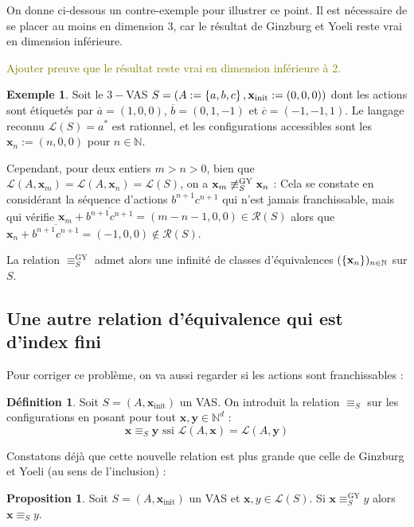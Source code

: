 \documentclass[a4paper,final]{article}
\theoremstyle{definition}
\newtheorem{Definition}[Theorem]{Définition}
\newtheorem{Proposition}[Theorem]{Proposition}
\newtheorem{Example}[Theorem]{Exemple}
\newcommand{\lucas}[1]{\textcolor{olive}{#1}}
\newcommand{\os}[1]{\left\{\mathinner{#1}\right\}}
\newcommand{\N}{\ensuremath{\mathbb{N}}}
\newcommand{\lang}{\ensuremath{\mathcal{L}}}
\newcommand{\reach}{\ensuremath{\mathcal{R}}}
\newcommand{\vect}[1]{\ensuremath{\mathbf{#1}}}
\newcommand{\rel}{\ensuremath{\equiv}}
\newcommand{\relGY}{\ensuremath{\equiv^\text{GY}_S}}
\newcommand{\ssi}{\ensuremath{\text{ ssi }}}
\newcommand{\xinit}{\ensuremath{\vect{x}_\text{init}}}
\newcommand{\valeur}[1]{\ensuremath{\overline{#1}}}
\begin{document}
\vspace{5mm}

On donne ci-dessous un contre-exemple pour illustrer ce point.
Il est nécessaire de se placer au moins en dimension 3, car le résultat de Ginzburg et Yoeli reste vrai en dimension inférieure.

\lucas{Ajouter preuve que le résultat reste vrai en dimension inférieure à 2.}

\begin{Example}
Soit le $3-$VAS $S = (A:=\os{a,b,c},\xinit:=(0,0,0))$ dont les actions sont étiquetés par $\valeur{a}=(1,0,0)$, $\valeur{b}=(0,1,-1)$ et $\valeur{c}=(-1,-1,1)$.
Le langage reconnu $\lang(S)=a^\ast$ est rationnel, et les configurations accessibles sont les $\vect{x}_n:=(n,0,0)$ pour $n\in\N$.

Cependant, pour deux entiers $m>n>0$, bien que $\lang(A,\vect{x}_m) =\lang(A,\vect{x}_n) =\lang(S)$, on a $\vect{x}_m \not\relGY \vect{x}_n$ :
Cela se constate en considérant la séquence d'actions $b^{n+1}c^{n+1}$ qui n'est jamais franchissable, mais qui vérifie $\vect{x}_m +\valeur{b^{n+1}c^{n+1}} = (m-n-1,0,0)\in \reach(S)$ alors que $\vect{x}_n +\valeur{b^{n+1}c^{n+1}} = (-1,0,0)\notin \reach(S)$.

La relation $\relGY$ admet alors une infinité de classes d'équivalences $(\os{\vect{x}_n})_{n\in\N}$ sur $S$.
\end{Example}


\subsection{Une autre relation d'équivalence qui est d'index fini}
Pour corriger ce problème, on va aussi regarder si les actions sont franchissables :

\begin{Definition}
Soit $S=(A,\xinit)$ un VAS. On introduit la relation $\rel_S$ sur les configurations en posant pour tout $\vect{x},\vect{y} \in\N^d$ :
$$\vect{x} \rel_S \vect{y} \ssi \lang(A,\vect{x}) = \lang(A,\vect{y})$$
\end{Definition}


Constatons déjà que cette nouvelle relation est plus grande que celle de Ginzburg et Yoeli (au sens de l'inclusion) :

\begin{Proposition}
Soit $S=(A,\xinit)$ un VAS et $\vect{x},y \in\lang(S)$.
Si $\vect{x} \relGY y$ alors $\vect{x} \rel_S y$.
\end{Proposition}
\end{document}
